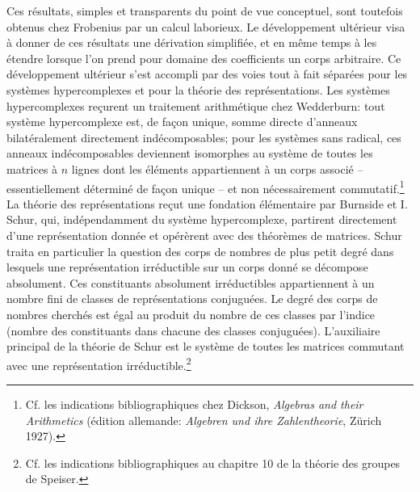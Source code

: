 Ces résultats, simples et transparents du point de vue conceptuel, sont toutefois obtenus chez Frobenius par un calcul laborieux. Le développement ultérieur visa à donner de ces résultats une dérivation simplifiée, et en même temps à les étendre lorsque l'on prend pour domaine des coefficients un corps arbitraire. Ce développement ultérieur s'est accompli par des voies tout à fait séparées pour les systèmes hypercomplexes et pour la théorie des représentations. Les systèmes hypercomplexes reçurent un traitement arithmétique chez Wedderburn: tout système hypercomplexe est, de façon unique, somme directe d'anneaux bilatéralement directement indécomposables; pour les systèmes sans radical, ces anneaux indécomposables deviennent isomorphes au système de toutes les matrices à $n$ lignes dont les éléments appartiennent à un corps associé -- essentiellement déterminé de façon unique -- et non nécessairement commutatif.\footnote{Cf. les indications bibliographiques chez Dickson, \emph{Algebras and their Arithmetics} (édition allemande: \emph{Algebren und ihre Zahlentheorie}, Zürich 1927).} La théorie des représentations reçut une fondation élémentaire par Burnside et I. Schur, qui, indépendamment du système hypercomplexe, partirent directement d'une représentation donnée et opérèrent avec des théorèmes de matrices. Schur traita en particulier la question des corps de nombres de plus petit degré dans lesquels une représentation irréductible sur un corps donné se décompose absolument. Ces constituants absolument irréductibles appartiennent à un nombre fini de classes de représentations conjuguées. Le degré des corps de nombres cherchés est égal au produit du nombre de ces classes par l'indice (nombre des constituants dans chacune des classes conjuguées). L'auxiliaire principal de la théorie de Schur est le système de toutes les matrices commutant avec une représentation irréductible.\footnote{Cf. les indications bibliographiques au chapitre 10 de la théorie des groupes de Speiser.}

